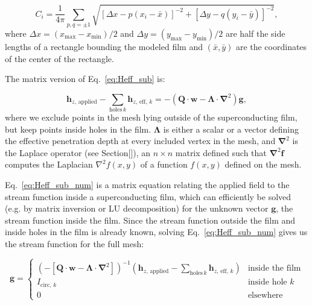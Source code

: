 \documentclass{article}
\begin{document}
\begin{equation}
    \label{eq:C_vector}
    C_i = \frac{1}{4\pi}\sum_{p,q=\pm1}\sqrt{[\Delta x - p(x_i-\bar{x})]^{-2} + [\Delta y - q(y_i-\bar{y})]^{-2}},
\end{equation}
where $\Delta x=(x_\mathrm{max}-x_\mathrm{min})/2$ and $\Delta y=(y_\mathrm{max}-y_\mathrm{min})/2$ are half the side lengths of a rectangle bounding the modeled film and $(\bar{x}, \bar{y})$ are the coordinates of the center of the rectangle.

The matrix version of Eq.~\ref{eq:Heff_sub} is:

\begin{equation}
    \label{eq:Heff_sub_num}
     \mathbf{h}_{z,\,\mathrm{applied}} - \sum_{\mathrm{holes}\, k}\mathbf{h}_{z,\,\mathrm{eff},\,k} = -(\mathbf{Q}\cdot\mathbf{w}-\mathbf{\Lambda}\cdot\mathbf{\nabla}^2)\mathbf{g},
\end{equation}
where we exclude points in the mesh lying outside of the superconducting film, but keep points
inside holes in the film. $\mathbf{\Lambda}$ is either a scalar or a vector defining the effective penetration depth at every included vertex in the mesh, and $\mathbf{\nabla}^2$
is the Laplace operator (see Section[]), an $n\times n$ matrix defined such that $\mathbf{\nabla}^2\mathbf{f}$ computes the Laplacian $\nabla^2f(x,y)$ of a function $f(x,y)$ defined on the mesh.

Eq.~\ref{eq:Heff_sub_num} is a matrix equation relating the applied field to the stream function
inside a superconducting film, which can efficiently be solved (e.g. by matrix inversion or LU decomposition) for the unknown vector $\mathbf{g}$, the stream function inside the film. Since the stream function outside the film and inside holes in the film is already known, solving Eq.~\ref{eq:Heff_sub_num} gives us the stream function for the full mesh:

\begin{equation}
    \label{eq:full_stream}
    \mathbf{g} = \begin{cases}
        \left(-[\mathbf{Q}\cdot\mathbf{w}-\mathbf{\Lambda}\cdot\mathbf{\nabla}^2]\right)^{-1}
        \left(\mathbf{h}_{z,\,\mathrm{applied}} - \sum_{\mathrm{holes}\,k}\mathbf{h}_{z,\,\mathrm{eff},\,k}\right)
            & \text{inside the film}\\
        I_{\mathrm{circ},\,k}
            & \text{inside hole }k\\
        0
            & \text{elsewhere}
    \end{cases}
\end{equation}
\end{document}
